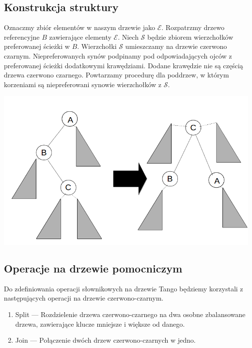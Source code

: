 \documentclass[declaration,shortabstract]{iithesis}
\theoremstyle{thm}
\theoremstyle{remark}
\theoremstyle{plain}
\theoremstyle{plain}
\theoremstyle{plain}
\begin{document}
 \subsection{Konstrukcja struktury}  

Oznaczmy zbiór elementów w naszym drzewie jako \(\mathcal{E}\). Rozpatrzmy drzewo referencyjne \(B\) zawierające elementy \(\mathcal{E}\). Niech \( \mathcal{S}\) będzie zbiorem wierzchołków preferowanej ścieżki w \(B\). Wierzchołki \(\mathcal{S}\) umieszczamy na drzewie czerwono czarnym. Niepreferowanych synów podpinamy pod odpowiadających ojców z preferowanej ścieżki dodatkowymi krawędziami. Dodane krawędzie nie są częścią drzewa czerwono czarnego. Powtarzamy procedurę dla poddrzew, w którym korzeniami są niepreferowani synowie wierzchołków z \(\mathcal{S}\).  

\includegraphics[scale=0.45]{Tango_path2.png}  

\subsection{Operacje na drzewie pomocniczym} Do zdefiniowania operacji słownikowych na drzewie Tango będziemy korzystali z następujących operacji na drzewie czerwono-czarnym. 
\begin{enumerate} 
\item{Split --- Rozdzielenie drzewa czerwono-czarnego na dwa osobne zbalansowane drzewa, zawierające klucze mniejsze i większe od danego.} 
\item{Join --- Połączenie dwóch drzew czerwono-czarnych w jedno.} 
\end{enumerate} 
\end{document}
